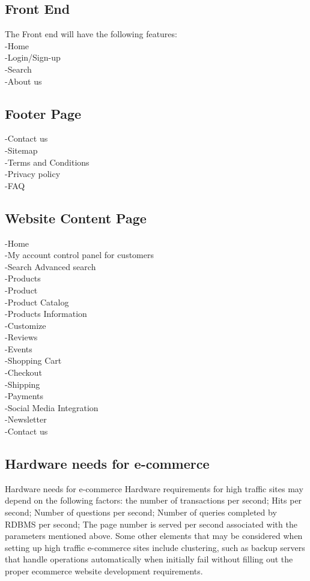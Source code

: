 \documentclass{article}
\begin{document}
\subsection{Front End}
The Front end will have the following features:\\
-Home\\
-Login/Sign-up\\
-Search\\
-About us\\


\subsection{Footer Page}
-Contact us\\
-Sitemap\\
-Terms and Conditions\\
-Privacy policy\\
-FAQ\\






\subsection{Website Content Page}
-Home\\
-My account control panel for customers\\
-Search Advanced search\\
-Products\\
-Product\\
-Product Catalog\\
-Products Information\\
-Customize\\
-Reviews\\
-Events\\
-Shopping Cart\\
-Checkout\\
-Shipping\\
-Payments\\
-Social Media Integration\\
-Newsletter\\
-Contact us\\

\subsection{Hardware needs for e-commerce}
Hardware needs for e-commerce
Hardware requirements for high traffic sites may depend on the following factors: the number of transactions per second; Hits per second; Number of questions per second; Number of queries completed by RDBMS per second; The page number is served per second associated with the parameters mentioned above.
Some other elements that may be considered when setting up high traffic e-commerce sites include clustering, such as backup servers that handle operations automatically when initially fail without filling out the proper ecommerce website development requirements.
\end{document}

